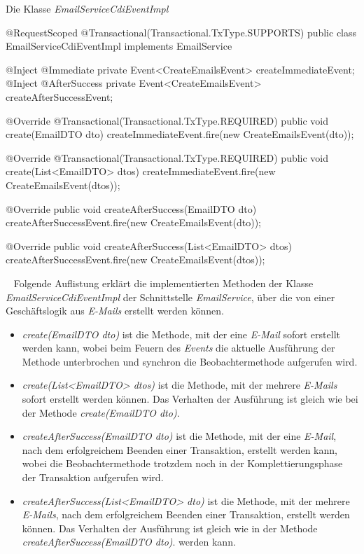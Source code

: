\begin{program}
\caption{Die Klasse \emph{EmailServiceCdiEventImpl}}
\label{prog:emailServiceCdiEventImpl}
\begin{JavaCode}
@RequestScoped
@Transactional(Transactional.TxType.SUPPORTS)
public class EmailServiceCdiEventImpl implements EmailService {
    @Inject
    @Immediate
    private Event<CreateEmailsEvent> createImmediateEvent;
    @Inject
    @AfterSuccess
    private Event<CreateEmailsEvent> createAfterSuccessEvent;

    @Override
    @Transactional(Transactional.TxType.REQUIRED)
    public void create(EmailDTO dto) {
        createImmediateEvent.fire(new CreateEmailsEvent(dto));
    }

    @Override
    @Transactional(Transactional.TxType.REQUIRED)
    public void create(List<EmailDTO> dtos) {
        createImmediateEvent.fire(new CreateEmailsEvent(dtos));
    }

    @Override
    public void createAfterSuccess(EmailDTO dto) {
        createAfterSuccessEvent.fire(new CreateEmailsEvent(dto));
    }

    @Override
    public void createAfterSuccess(List<EmailDTO> dtos) {
        createAfterSuccessEvent.fire(new CreateEmailsEvent(dtos));
    }
}
\end{JavaCode}
\end{program}
\ \newline
Folgende Auflistung erklärt die implementierten Methoden der Klasse \emph{EmailServiceCdiEventImpl} der Schnittstelle \emph{EmailService}, über die von einer Geschäftslogik aus \emph{E-Mails} erstellt werden können.
\begin{itemize}
	\item\emph{create(EmailDTO dto)}
	\newline
	ist die Methode, mit der eine \emph{E-Mail} sofort erstellt werden kann, wobei beim Feuern des \emph{Events} die aktuelle Ausführung der Methode unterbrochen und synchron die Beobachtermethode aufgerufen wird.
	\item\emph{create(List<EmailDTO> dtos)}
	\newline
	ist die Methode, mit der mehrere \emph{E-Mails} sofort erstellt werden können. Das Verhalten der Ausführung ist gleich wie bei der Methode \emph{create(EmailDTO dto)}.
	\item\emph{createAfterSuccess(EmailDTO dto)}
	\newline
	ist die Methode, mit der eine \emph{E-Mail}, nach dem erfolgreichem Beenden einer Transaktion, erstellt werden kann, wobei die Beobachtermethode trotzdem noch in der Komplettierungsphase der Transaktion aufgerufen wird.
	\item\emph{createAfterSuccess(List<EmailDTO> dto)}
	\newline
	ist die Methode, mit der mehrere \emph{E-Mails}, nach dem erfolgreichem Beenden einer Transaktion, erstellt werden können. Das Verhalten der Ausführung ist gleich wie in der Methode \emph{createAfterSuccess(EmailDTO dto)}.
 werden kann.    
\end{itemize} 
